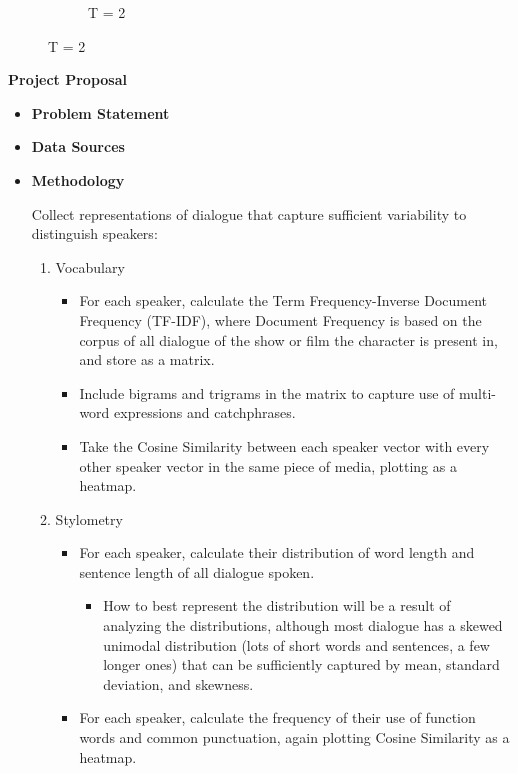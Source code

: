 \documentclass{article}
\begin{document}
\begin{titlepage}
\begin{figure}[H]
\begin{subfigure}[b]{0.45\textwidth}
            \caption{T = 2}
            \label{fig:subfig2}
        \end{subfigure}
        \label{fig:main}
    \end{figure} 
        { \Large \bfseries Project Proposal}

        \begin{itemize}
            \item[] \textbf{Problem Statement}
            
			

            \item[] \textbf{Data Sources}
            

        \item[] \textbf{Methodology}
            
		Collect representations of dialogue that capture sufficient variability to distinguish speakers:
		
		\begin{enumerate}
		
			\item Vocabulary
			\begin{itemize}
				\item For each speaker, calculate the Term Frequency-Inverse Document Frequency (TF-IDF), where Document Frequency is based on the corpus of all dialogue of the show or film the character is present in, and store as a matrix.
				\item Include bigrams and trigrams in the matrix to capture use of multi-word expressions and catchphrases.
				\item Take the Cosine Similarity between each speaker vector with every other speaker vector in the same piece of media, plotting as a heatmap.
			\end{itemize}
		
			\item Stylometry
			\begin{itemize}
				\item For each speaker, calculate their distribution of word length and sentence length of all dialogue spoken.
				\begin{itemize}
					\item How to best represent the distribution will be a result of analyzing the distributions, although most dialogue has a skewed unimodal distribution (lots of short words and sentences, a few longer ones) that can be sufficiently captured by mean, standard deviation, and skewness.
				\end{itemize}
				\item For each speaker, calculate the frequency of their use of function words and common punctuation, again plotting Cosine Similarity as a heatmap.
			\end{itemize}
		

\end{enumerate}
\end{itemize}
\end{titlepage}
\end{document}
